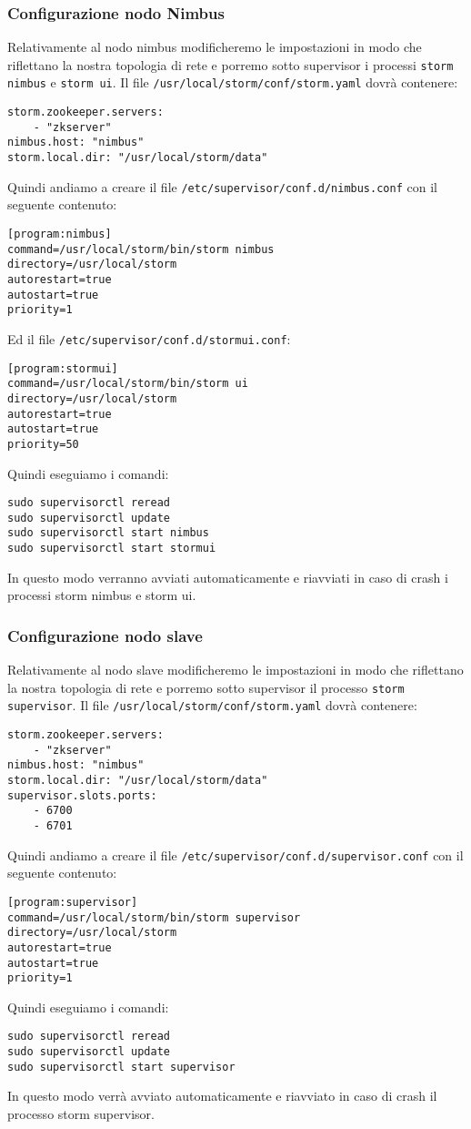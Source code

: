 \documentclass[12pt]{article}
\begin{document}
\subsubsection{Configurazione nodo Nimbus}
Relativamente al nodo nimbus modificheremo le impostazioni in modo che riflettano la nostra topologia di rete e porremo sotto supervisor i processi \texttt{storm nimbus} e \texttt{storm ui}.
Il file \texttt{/usr/local/storm/conf/storm.yaml} dovr\`a contenere:
\begin{lstlisting}
storm.zookeeper.servers:
    - "zkserver"
nimbus.host: "nimbus"
storm.local.dir: "/usr/local/storm/data"
\end{lstlisting}
Quindi andiamo a creare il file \texttt{/etc/supervisor/conf.d/nimbus.conf} con il seguente contenuto:
\begin{lstlisting}
[program:nimbus]
command=/usr/local/storm/bin/storm nimbus
directory=/usr/local/storm
autorestart=true
autostart=true
priority=1
\end{lstlisting}
Ed il file \texttt{/etc/supervisor/conf.d/stormui.conf}:
\begin{lstlisting}
[program:stormui]
command=/usr/local/storm/bin/storm ui
directory=/usr/local/storm
autorestart=true
autostart=true
priority=50
\end{lstlisting}
Quindi eseguiamo i comandi:
\begin{lstlisting}
sudo supervisorctl reread
sudo supervisorctl update
sudo supervisorctl start nimbus
sudo supervisorctl start stormui
\end{lstlisting}
In questo modo verranno avviati automaticamente e riavviati in caso di crash i processi storm nimbus e storm ui.
\subsubsection{Configurazione nodo slave}
Relativamente al nodo slave modificheremo le impostazioni in modo che riflettano la nostra topologia di rete e porremo sotto supervisor il processo \texttt{storm supervisor}.
Il file \texttt{/usr/local/storm/conf/storm.yaml} dovr\`a contenere:
\begin{lstlisting}
storm.zookeeper.servers:
    - "zkserver"
nimbus.host: "nimbus"
storm.local.dir: "/usr/local/storm/data"
supervisor.slots.ports: 
    - 6700
    - 6701
\end{lstlisting}
Quindi andiamo a creare il file \texttt{/etc/supervisor/conf.d/supervisor.conf} con il seguente contenuto:
\begin{lstlisting}
[program:supervisor]
command=/usr/local/storm/bin/storm supervisor
directory=/usr/local/storm
autorestart=true
autostart=true
priority=1
\end{lstlisting}
Quindi eseguiamo i comandi:
\begin{lstlisting}
sudo supervisorctl reread
sudo supervisorctl update
sudo supervisorctl start supervisor
\end{lstlisting}
In questo modo verr\`a avviato automaticamente e riavviato in caso di crash il processo storm supervisor.
\end{document}
